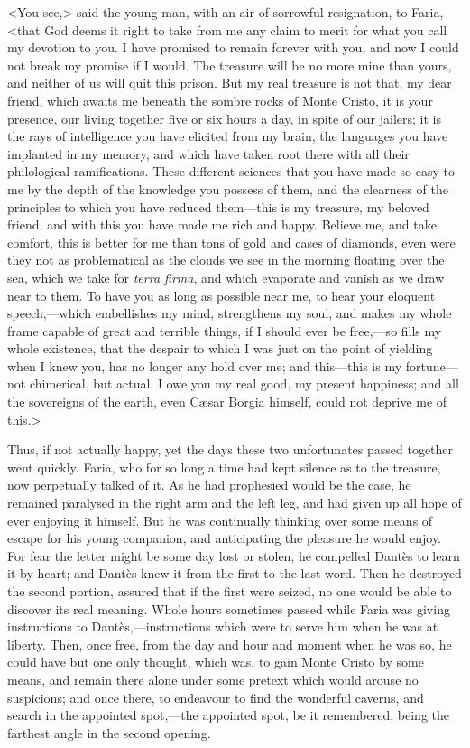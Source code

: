  <You see,> said the young man, with an air of sorrowful resignation, to Faria, <that God deems it right to take from me any claim to merit for what you call my devotion to you. I have promised to remain forever with you, and now I could not break my promise if I would. The treasure will be no more mine than yours, and neither of us will quit this prison. But my real treasure is not that, my dear friend, which awaits me beneath the sombre rocks of Monte Cristo, it is your presence, our living together five or six hours a day, in spite of our jailers; it is the rays of intelligence you have elicited from my brain, the languages you have implanted in my memory, and which have taken root there with all their philological ramifications. These different sciences that you have made so easy to me by the depth of the knowledge you possess of them, and the clearness of the principles to which you have reduced them—this is my treasure, my beloved friend, and with this you have made me rich and happy. Believe me, and take comfort, this is better for me than tons of gold and cases of diamonds, even were they not as problematical as the clouds we see in the morning floating over the sea, which we take for \textit{terra firma}, and which evaporate and vanish as we draw near to them. To have you as long as possible near me, to hear your eloquent speech,—which embellishes my mind, strengthens my soul, and makes my whole frame capable of great and terrible things, if I should ever be free,—so fills my whole existence, that the despair to which I was just on the point of yielding when I knew you, has no longer any hold over me; and this—this is my fortune—not chimerical, but actual. I owe you my real good, my present happiness; and all the sovereigns of the earth, even Cæsar Borgia himself, could not deprive me of this.> 

 Thus, if not actually happy, yet the days these two unfortunates passed together went quickly. Faria, who for so long a time had kept silence as to the treasure, now perpetually talked of it. As he had prophesied would be the case, he remained paralysed in the right arm and the left leg, and had given up all hope of ever enjoying it himself. But he was continually thinking over some means of escape for his young companion, and anticipating the pleasure he would enjoy. For fear the letter might be some day lost or stolen, he compelled Dantès to learn it by heart; and Dantès knew it from the first to the last word. Then he destroyed the second portion, assured that if the first were seized, no one would be able to discover its real meaning. Whole hours sometimes passed while Faria was giving instructions to Dantès,—instructions which were to serve him when he was at liberty. Then, once free, from the day and hour and moment when he was so, he could have but one only thought, which was, to gain Monte Cristo by some means, and remain there alone under some pretext which would arouse no suspicions; and once there, to endeavour to find the wonderful caverns, and search in the appointed spot,—the appointed spot, be it remembered, being the farthest angle in the second opening. 

